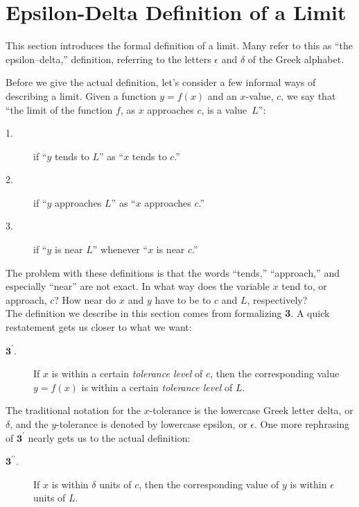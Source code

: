 
\section{Epsilon-Delta Definition of a Limit}\label{sec:limit_def}

This section introduces the formal definition of a limit. Many refer to this as ``the epsilon--delta,'' definition, referring to the letters $\epsilon$ and $\delta$ of the Greek alphabet.\bigskip

Before we give the actual definition, let's consider a few informal ways of describing a limit.  Given a function $y=f(x)$ and an $x$-value, $c$, we say that ``the limit of the function $f$, as $x$ approaches $c$, is a value~$L$'': 

\begin{description}
\item[1.]if ``$y$ tends to $L$'' as ``$x$ tends to $c$.''
\item[2.]if ``$y$ approaches $L$'' as ``$x$ approaches $c$.''
\item[3.]if ``$y$ is near $L$'' whenever ``$x$ is near $c$.''
\end{description}

The problem with these definitions is that the words ``tends,'' ``approach,'' and especially ``near'' are not exact.  In what way does the variable $x$ tend to, or approach, $c$? How near do $x$ and $y$ have to be to $c$ and $L$, respectively?  \\

The definition we describe in this section comes from formalizing {\bf 3}.  A quick restatement gets us closer to what we want:

\begin{description}
\item[$\textbf{3}^\prime$.]If $x$ is within a certain \textit{tolerance level} of $c$, then the corresponding value $y=f(x)$ is within a certain \textit{tolerance level} of $L$.
\end{description}

The traditional notation for the $x$-tolerance is the lowercase Greek letter delta, or $\delta$, and the $y$-tolerance is denoted by lowercase epsilon, or $\epsilon$. One more rephrasing of $\textbf{3}^\prime$ nearly gets us to the actual definition:

\begin{description}
\item[$\textbf{3}^{\prime \prime}$.]If $x$ is within $\delta$ units of $c$, then the corresponding value of $y$ is within $\epsilon$ units of $L$.
\end{description}

